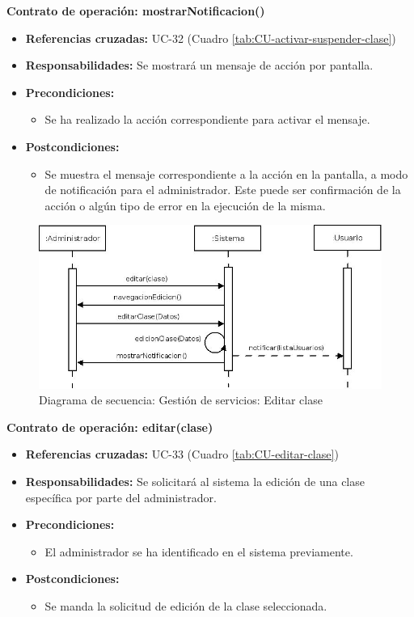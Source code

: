 \textbf{Contrato de operación: mostrarNotificacion()}
\begin{itemize}
\item \textbf{Referencias cruzadas:} UC-32 (Cuadro \ref{tab:CU-activar-suspender-clase})
\item \textbf{Responsabilidades:} Se mostrará un mensaje de acción por pantalla.
\item \textbf{Precondiciones:} 
 \begin{itemize}
\item Se ha realizado la acción correspondiente para activar el mensaje.
\end {itemize}
\item \textbf{Postcondiciones:} 
 \begin{itemize}
\item Se muestra el mensaje correspondiente a la acción en la pantalla, a modo de notificación para el administrador. Este puede ser confirmación de la acción o algún tipo de error en la ejecución de la misma.
\end {itemize}
\end {itemize}


\vspace{7mm}
\dotfill
\vspace{7mm}

\begin{figure}[h!]
\centering
  \includegraphics[scale=.50]{img/secuencias/gestion-servicios-editar-clase.jpeg}
  \caption{Diagrama de secuencia: Gestión de servicios: Editar clase}
  \label{fig:secuencia-editar-clase}
\end{figure}

\textbf{Contrato de operación: editar(clase)}
\begin{itemize}
\item \textbf{Referencias cruzadas:} UC-33 (Cuadro \ref{tab:CU-editar-clase})
\item \textbf{Responsabilidades:} Se solicitará al sistema la edición de una clase específica por parte del administrador.
\item \textbf{Precondiciones:} 
 \begin{itemize}
\item El administrador se ha identificado en el sistema previamente.
\end {itemize}
\item \textbf{Postcondiciones:} 
 \begin{itemize}
\item Se manda la solicitud de edición de la clase seleccionada.
\end {itemize}
\end {itemize}

